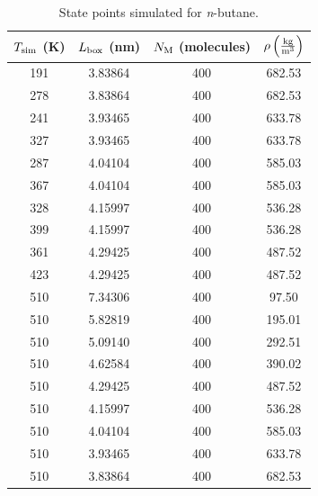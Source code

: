 \documentclass[journal=jctc,manuscript=article]{achemso}
\begin{document}
\begin{table}[p!]
	\caption{State points simulated for \textit{n}-butane.} \label{tab:C4H10 state points}
	\begin{center}
		\begin{tabular}{|c|c|c|c|}
			\hline
			$T_{\rm sim}$ (K) & $L_{\rm box}$ (nm) & $N_{\rm M}$ (molecules) & $\rho \left(\frac{\rm kg}{\rm m^3}\right)$ \\ \hline
			191 & 3.83864 & 400 & 682.53 \\
			278 & 3.83864 & 400 & 682.53 \\
			241 & 3.93465 & 400 & 633.78 \\
			327 & 3.93465 & 400 & 633.78 \\
			287 & 4.04104 & 400 & 585.03 \\
			367 & 4.04104 & 400 & 585.03 \\
			328 & 4.15997 & 400 & 536.28 \\
			399 & 4.15997 & 400 & 536.28 \\
			361 & 4.29425 & 400 & 487.52 \\
			423 & 4.29425 & 400 & 487.52 \\
			510 & 7.34306 & 400 & 97.50  \\
			510 & 5.82819 & 400 & 195.01 \\
			510 & 5.09140 & 400 & 292.51 \\
			510 & 4.62584 & 400 & 390.02 \\
			510 & 4.29425 & 400 & 487.52 \\
			510 & 4.15997 & 400 & 536.28 \\
			510 & 4.04104 & 400 & 585.03 \\
			510 & 3.93465 & 400 & 633.78 \\
			510 & 3.83864 & 400 & 682.53 \\
			\hline
		\end{tabular}
	\end{center}
\end{table}
\end{document}
